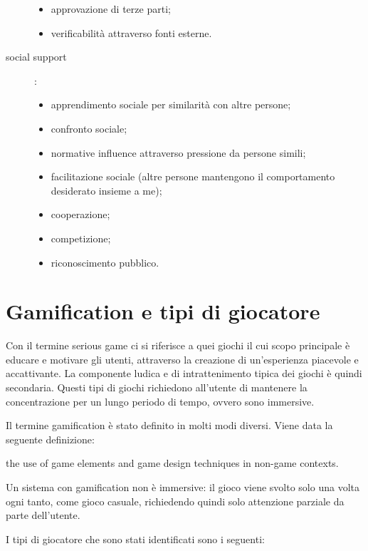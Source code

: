 \begin{description}
\begin{itemize}
        \item approvazione di terze parti;
        \item verificabilità attraverso fonti esterne.
    \end{itemize}
    \item[social support]:
    \begin{itemize}
        \item apprendimento sociale per similarità con altre persone;
        \item confronto sociale;
        \item normative influence attraverso pressione da persone simili;
        \item facilitazione sociale (altre persone mantengono il comportamento desiderato insieme a me);
        \item cooperazione;
        \item competizione;
        \item riconoscimento pubblico.
    \end{itemize} 
\end{description}

\section{Gamification e tipi di giocatore\label{sec:gamification-giocatore}}

Con il termine serious game ci si riferisce a quei giochi il cui scopo principale è educare e motivare gli utenti, attraverso la creazione di un'esperienza piacevole e accattivante. La componente ludica e di intrattenimento tipica dei giochi è quindi secondaria.
Questi tipi di giochi richiedono all'utente di mantenere la concentrazione per un lungo periodo di tempo, ovvero sono immersive.

Il termine gamification è stato definito in molti modi diversi. Viene data la seguente definizione:
\begin{quoting}
    \omissis the use of game elements and game design techniques in non-game contexts. \omissis
\end{quoting}

Un sistema con gamification non è immersive: il gioco viene svolto solo una volta ogni tanto, come gioco casuale, richiedendo quindi solo attenzione parziale da parte dell'utente.

I tipi di giocatore che sono stati identificati sono i seguenti:

